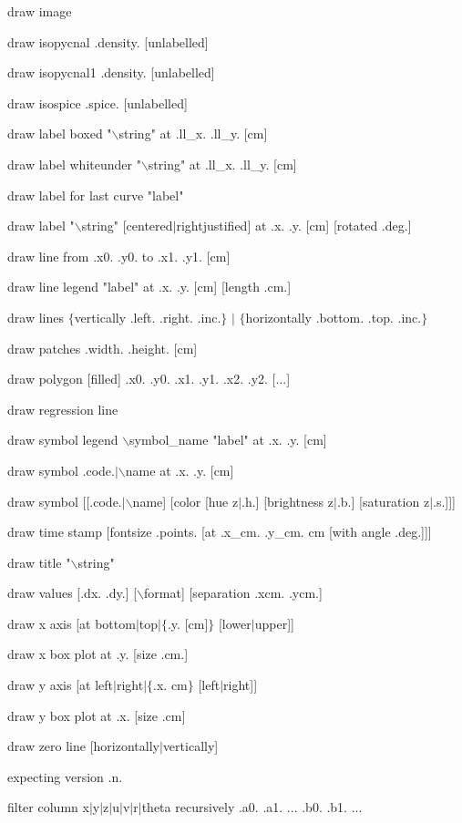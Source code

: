 draw image

draw isopycnal .density. [unlabelled]

draw isopycnal1 .density. [unlabelled]

draw isospice .spice. [unlabelled]

draw label boxed "$\backslash$string" at .ll\_x. .ll\_y. [cm]

draw label whiteunder "$\backslash$string" at .ll\_x. .ll\_y. [cm]

draw label for last curve "label"

draw label "$\backslash$string" [centered$\mid$rightjustified] at .x. .y. [cm] [rotated .deg.]

draw line from .x0. .y0. to .x1. .y1. [cm]

draw line legend "label" at .x. .y. [cm] [length .cm.]

draw lines $\lbrace$vertically .left. .right. .inc.$\rbrace$ $\mid$ $\lbrace$horizontally .bottom. .top. .inc.$\rbrace$

draw patches .width. .height. [cm]

draw polygon [filled] .x0. .y0. .x1. .y1. .x2. .y2. [...]

draw regression line

draw symbol legend $\backslash$symbol\_name "label" at .x. .y. [cm]

draw symbol .code.$\mid$$\backslash$name at .x. .y. [cm]

draw symbol [[.code.$\mid$$\backslash$name] [color [hue z$\mid$.h.] [brightness z$\mid$.b.] [saturation z$\mid$.s.]]]

draw time stamp [fontsize .points. [at .x\_cm. .y\_cm. cm [with angle .deg.]]]

draw title "$\backslash$string"

draw values [.dx. .dy.] [$\backslash$format] [separation .xcm. .ycm.]

draw x axis [at bottom$\mid$top$\mid$$\lbrace$.y. [cm]$\rbrace$ [lower$\mid$upper]]

draw x box plot at .y. [size .cm.]

draw y axis [at left$\mid$right$\mid$$\lbrace$.x. cm$\rbrace$ [left$\mid$right]]

draw y box plot at .x. [size .cm]

draw zero line [horizontally$\mid$vertically]

expecting version .n.

filter column x$\mid$y$\mid$z$\mid$u$\mid$v$\mid$r$\mid$theta recursively .a0. .a1. ... .b0. .b1. ...

